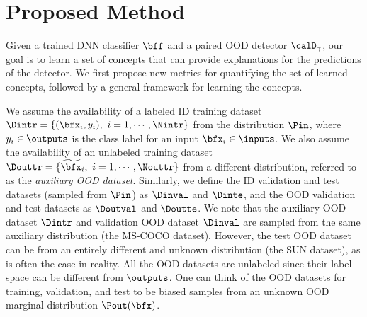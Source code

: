 \section{Proposed Method}
Given a trained DNN classifier $\bff$ and a paired OOD detector $\calD_\gamma$, our goal is to learn a set of concepts that can provide explanations for the predictions of the detector.
We first propose new metrics for quantifying the set of learned concepts, followed by a general framework for learning the concepts.

We assume the availability of a labeled ID training dataset $\Dintr = \{(\bfx_i, y_i), ~i = 1, \cdots, \Nintr\}$ from the distribution $\Pin$, where $y_i \in \outputs$ is the class label for an input $\bfx_i \in \inputs$.
We also assume the availability of an unlabeled training dataset $\Douttr = \{\widetilde{\bfx}_i, ~i = 1, \cdots,  \Nouttr\}$ from a different distribution, referred to as the {\em auxiliary OOD dataset}.
Similarly, we define the ID validation and test datasets (sampled from $\Pin$) as $\Dinval$ and $\Dinte$, and the OOD validation and test datasets as $\Doutval$ and $\Doutte$.
We note that the auxiliary OOD dataset $\Dintr$ and validation OOD dataset $\Dinval$ are sampled from the same auxiliary distribution (\eg the MS-COCO dataset). However, the test OOD dataset can be from an entirely different and unknown distribution (\eg the SUN dataset), as is often the case in reality.
All the OOD datasets are unlabeled since their label space can be different from $\outputs$. One can think of the OOD datasets for training, validation, and test to be biased samples from an unknown OOD marginal distribution $\Pout(\bfx)$.

